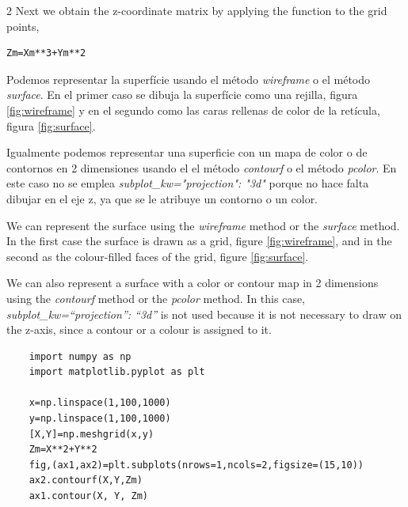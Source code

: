 \begin{paracol} {2}
Next we obtain the z-coordinate matrix by applying the function to the grid points,

\begin{verbatim}
Zm=Xm**3+Ym**2
\end{verbatim}

\switchcolumn
Podemos representar la superfície usando el método \textit{wireframe} o el método \textit{surface}. En el primer caso se dibuja la superfície como una rejilla, figura \ref{fig:wireframe} y en el segundo como las caras rellenas de color de la retícula, figura \ref{fig:surface}.

Igualmente podemos representar una superficie con un mapa de color o de contornos en 2 dimensiones usando el el método \textit{contourf} o el método \textit{pcolor}. En este caso no se emplea \textit{subplot\_kw="projection": "3d"} porque no hace falta dibujar en el eje z, ya que se le atribuye un contorno o un color.



\switchcolumn

We can represent the surface using the \textit{wireframe} method or the \textit{surface} method. In the first case the surface is drawn as a grid, figure \ref{fig:wireframe}, and in the second as the colour-filled faces of the grid, figure \ref{fig:surface}.

We can also represent a surface with a color or contour map in 2 dimensions using the \textit{contourf} method or the \textit{pcolor} method. In this case, \textit{subplot\_kw=“projection”: “3d”} is not used because it is not necessary to draw on the z-axis, since a contour or a colour is assigned to it.
\end{paracol}
\begin{verbatim}
	import numpy as np
	import matplotlib.pyplot as plt
	
	x=np.linspace(1,100,1000)
	y=np.linspace(1,100,1000)
	[X,Y]=np.meshgrid(x,y)
	Zm=X**2+Y**2
	fig,(ax1,ax2)=plt.subplots(nrows=1,ncols=2,figsize=(15,10))
	ax2.contourf(X,Y,Zm)
	ax1.contour(X, Y, Zm)
\end{verbatim}
